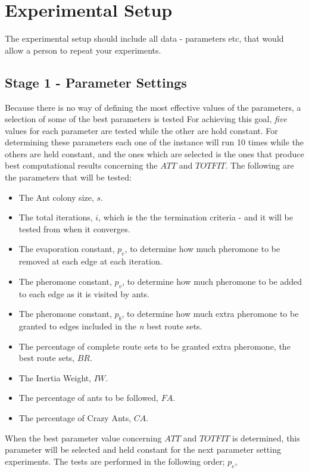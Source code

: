 \section{Experimental Setup}

The experimental setup should include all data - parameters etc, that would allow a person to repeat your experiments. 
 
\subsection{Stage 1 - Parameter Settings}
\label{subsec:parameterSettings_setup}

Because there is no way of defining the most effective values of the parameters, a selection of some of the best parameters is tested For achieving this goal, \textit{five} values for each parameter are tested while the other are hold constant. For determining these parameters each one of the instance will run 10 times while the others are held constant, and the ones which are selected is the ones that produce best computational results concerning the $ATT$ and $TOTFIT$. The following are the parameters that will be tested:

\begin{itemize}
\item The Ant colony size, $s$.
\item The total iterations, $i$, which is the the termination criteria - and it will be tested from when it converges. 
\item The evaporation constant, $p_{e}$, to determine how much pheromone to be removed at each edge at each iteration. 
\item The pheromone constant, $p_{v}$, to determine how much pheromone to be added to each edge as it is visited by ants. 
\item The pheromone constant, $p_{b}$, to determine how much extra pheromone to be granted to edges included in the \textit{n} best route sets.
\item The percentage of complete route sets to be granted extra pheromone, the best route sets, $BR$.
\item The Inertia Weight, $IW$.
\item The percentage of ants to be followed, $FA$.
\item The percentage of Crazy Ants, $CA$.
\end{itemize}

When the best parameter value concerning $ATT$ and $TOTFIT$ is determined, this parameter will be selected and held constant for the next parameter setting experiments. The tests are performed in the following order; $p_{e}$, 

